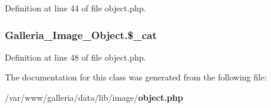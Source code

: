 Definition at line 44 of file object.php.
\subsubsection{\setlength{\rightskip}{0pt plus 5cm}Galleria\_\-Image\_\-Object.\$\_\-cat\hspace{0.3cm}{\tt  [protected]}}\label{classGalleria__Image__Object_374264c554c130dad1fa076f452b97b7}




Definition at line 48 of file object.php.

The documentation for this class was generated from the following file:\begin{CompactItemize}
\item 
/var/www/galleria/data/lib/image/{\bf object.php}\end{CompactItemize}
